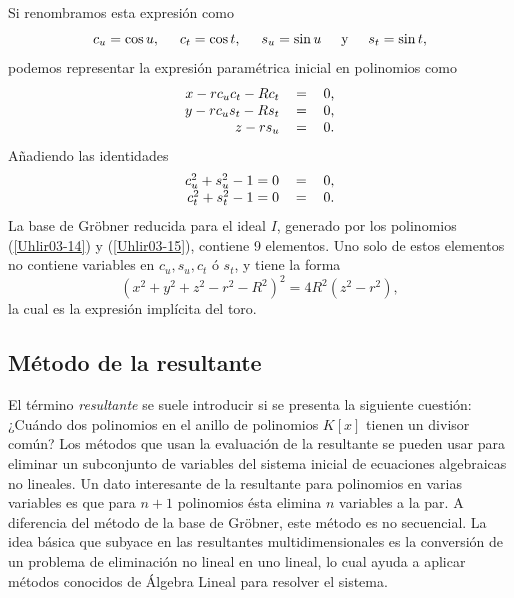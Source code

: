 Si renombramos esta expresión como
\begin{equation}\label{Uhlir03-14}
c_u = \cos u, \hspace{0.5cm} c_t = \cos t, \hspace{0.5cm} s_u = \sin u \hspace{0.5cm} \text{y} \hspace{0.5cm} s_t = \sin t,
\end{equation}
podemos representar la expresión paramétrica inicial en polinomios como
\begin{equation}\label{Uhlir03-15}
\begin{tabular}{r c c}
$x - r c_u c_t - R c_t$ & $=$ & $0$, \\
$y - r c_u s_t - R s_t$ & $=$ & $0$, \\
$z - r s_u$ & $=$ & $0$.
\end{tabular}
\end{equation}
Añadiendo las identidades
\begin{equation}
\begin{tabular}{r c c}
$c_u^2 + s_u^2 - 1 = 0$ & $=$ & $0$, \\
$c_t^2 + s_t^2 - 1 = 0$ & $=$ & $0$.
\end{tabular}
\end{equation}
La base de Gröbner reducida para el ideal $I$, generado por los polinomios (\ref{Uhlir03-14}) y (\ref{Uhlir03-15}), contiene 9 elementos. Uno solo de estos elementos no contiene variables en $c_u, s_u, c_t \text{ ó } s_t$, y tiene la forma
$$(x^2 + y^2 + z^2 - r^2 - R^2)^2 = 4 R^2 (z^2 - r^2),$$
la cual es la expresión implícita del toro.

\subsection{Método de la resultante}

El término { \em resultante} se suele introducir si se presenta la siguiente cuestión: ¿Cuándo dos polinomios en el anillo de polinomios $K[x]$ tienen un divisor común? Los métodos que usan la evaluación de la resultante se pueden usar para eliminar un subconjunto de variables del sistema inicial de ecuaciones algebraicas no lineales.
Un dato interesante de la resultante para polinomios en varias variables es que para $n+1$ polinomios ésta elimina $n$ variables a la par. A diferencia del método de la base de Gröbner, este método es no secuencial. La idea básica que subyace en las resultantes multidimensionales es la conversión de un problema de eliminación no lineal en uno lineal, lo cual ayuda a aplicar métodos conocidos de Álgebra Lineal para resolver el sistema.

